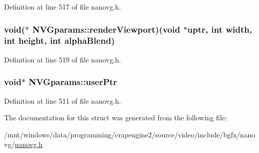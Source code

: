 Definition at line 517 of file nanovg.\+h.

\hypertarget{struct_n_v_gparams_aa58560027660da6375360427ad5271e2}{
\subsubsection[{render\+Viewport}]{\setlength{\rightskip}{0pt plus 5cm}void($\ast$ N\+V\+Gparams\+::render\+Viewport)(void $\ast$uptr, int width, int height, int alpha\+Blend)}}\label{struct_n_v_gparams_aa58560027660da6375360427ad5271e2}


Definition at line 519 of file nanovg.\+h.

\hypertarget{struct_n_v_gparams_a6976a0363fdbfa0ef1e756556ef05f97}{
\subsubsection[{user\+Ptr}]{\setlength{\rightskip}{0pt plus 5cm}void$\ast$ N\+V\+Gparams\+::user\+Ptr}}\label{struct_n_v_gparams_a6976a0363fdbfa0ef1e756556ef05f97}


Definition at line 511 of file nanovg.\+h.



The documentation for this struct was generated from the following file\+:\begin{DoxyCompactItemize}
\item 
/mnt/windows/data/programming/crapengine2/source/video/include/bgfx/nanovg/\hyperlink{nanovg_8h}{nanovg.\+h}\end{DoxyCompactItemize}
